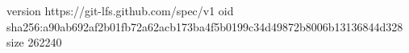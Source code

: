 version https://git-lfs.github.com/spec/v1
oid sha256:a90ab692af2b01fb72a62acb173ba4f5b0199c34d49872b8006b13136844d328
size 262240
